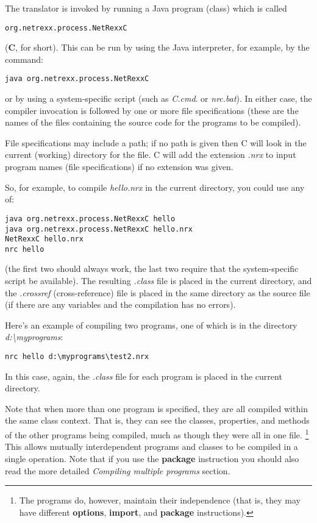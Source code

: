 The translator is invoked by running a Java program (class) which is
called 
\begin{verbatim}
org.netrexx.process.NetRexxC
\end{verbatim}  
(\textbf{\nr{}C}, for short). This can be run by using the Java interpreter, for example,
by the command:
\begin{verbatim}
java org.netrexx.process.NetRexxC
\end{verbatim}
or by using a system-specific script (such as \emph{\nr{}C.cmd}.
or \emph{nrc.bat}).  In either case, the compiler invocation is followed
by one or more file specifications (these are the names of the files
containing the \nr{} source code for the programs to be compiled).

File specifications may include a path; if no path is given then
\nr{}C will look in the current (working) directory for the file.
\nr{}C will add the extension \emph{.nrx} to input program names (file
specifications) if no extension was given.

So, for example, to compile \emph{hello.nrx} in the current directory,
you could use any of:
\begin{verbatim}
java org.netrexx.process.NetRexxC hello
java org.netrexx.process.NetRexxC hello.nrx
NetRexxC hello.nrx
nrc hello
\end{verbatim}
(the first two should always work, the last two require that the
system-specific script be available).  The resulting \emph{.class} file
is placed in the current directory, and the \emph{.crossref}
(cross-reference) file is placed in the same directory as the source
file (if there are any variables and the compilation has no errors).

Here's an example of compiling two programs, one of which is in the
directory \emph{d:\textbackslash myprograms}:
\begin{verbatim}
nrc hello d:\myprograms\test2.nrx
\end{verbatim}

In this case, again, the \emph{.class} file for each program is placed
in the current directory.

Note that when more than one program is specified, they are all compiled
within the same class context.  That is, they can see the
classes, properties, and methods of the other programs being compiled,
much as though they were all in one file.
\footnote{The programs do, however, maintain their independence (that is, they may
have different \textbf{options}, \textbf{import}, and \textbf{package}
instructions).}
This allows mutually interdependent programs and classes to be compiled
in a single operation.
Note that if you use the \textbf{package} instruction you should also
read the more detailed \emph{Compiling multiple
programs} section.%

